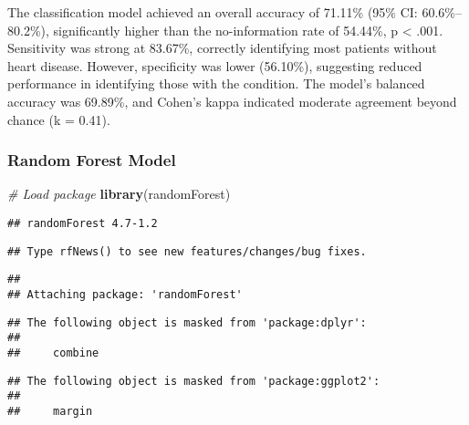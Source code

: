 \documentclass[
]{article}
\newenvironment{Shaded}{\begin{snugshade}}{\end{snugshade}}
\newcommand{\CommentTok}[1]{\textcolor[rgb]{0.56,0.35,0.01}{\textit{#1}}}
\newcommand{\FunctionTok}[1]{\textcolor[rgb]{0.13,0.29,0.53}{\textbf{#1}}}
\newcommand{\NormalTok}[1]{#1}
\begin{document}
The classification model achieved an overall accuracy of 71.11\% (95\%
CI: 60.6\%--80.2\%), significantly higher than the no-information rate
of 54.44\%, p \textless{} .001. Sensitivity was strong at 83.67\%,
correctly identifying most patients without heart disease. However,
specificity was lower (56.10\%), suggesting reduced performance in
identifying those with the condition. The model's balanced accuracy was
69.89\%, and Cohen's kappa indicated moderate agreement beyond chance (k
= 0.41).

\subsubsection{Random Forest Model}\label{random-forest-model}

\begin{Shaded}
\begin{Highlighting}[]
\CommentTok{\# Load package}
\FunctionTok{library}\NormalTok{(randomForest)}
\end{Highlighting}
\end{Shaded}

\begin{verbatim}
## randomForest 4.7-1.2
\end{verbatim}

\begin{verbatim}
## Type rfNews() to see new features/changes/bug fixes.
\end{verbatim}

\begin{verbatim}
## 
## Attaching package: 'randomForest'
\end{verbatim}

\begin{verbatim}
## The following object is masked from 'package:dplyr':
## 
##     combine
\end{verbatim}

\begin{verbatim}
## The following object is masked from 'package:ggplot2':
## 
##     margin
\end{verbatim}
\end{document}
